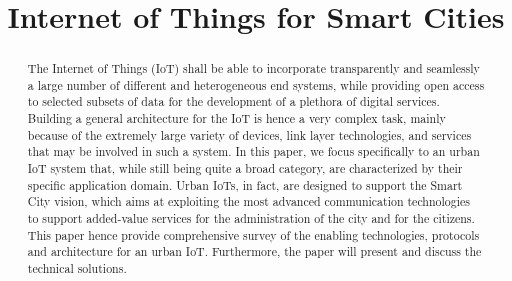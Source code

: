 \documentclass[conference,column]{IEEEtran}
\begin{document}
\title{Internet of Things for Smart Cities}
\author{}

\maketitle

\begin{abstract}
The Internet of Things (IoT) shall be able to incorporate transparently and seamlessly a large number
of different and heterogeneous end systems, while providing open access to selected subsets of data for the
development of a plethora of digital services. Building a general architecture for the IoT is hence a very complex
task, mainly because of the extremely large variety of devices, link layer technologies, and services that may
be involved in such a system. In this paper, we focus specifically to an urban IoT system that, while still being quite a broad category, are characterized by their specific application domain. Urban IoTs, in fact, are designed to support the Smart City vision, which aims at exploiting the most advanced communication technologies to support added-value services for the administration of the city and for the citizens. This paper hence provide   comprehensive survey of the enabling technologies, protocols and architecture for an urban IoT. Furthermore, the paper will present and discuss the technical solutions.


\end{abstract}

	\begin{IEEEkeywords}
	IoT,{Web Service Approach,Data Format, Application, Transport Layers,URI mapping,Devices 
	\end{IEEEkeywords}
\end{document}
